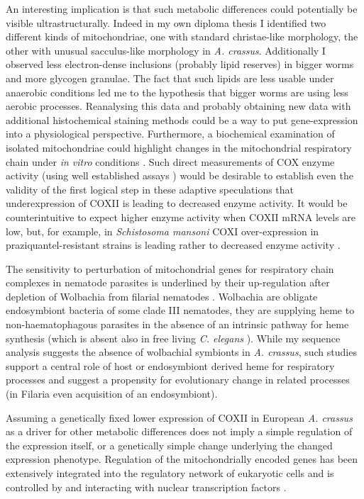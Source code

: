 An interesting implication is that such metabolic differences could
potentially be visible ultrastructurally. Indeed in my own diploma
thesis \cite{heitlinger_vergleichende_2008} I identified two different
kinds of mitochondriae, one with standard christae-like morphology,
the other with unusual sacculus-like morphology in
\textit{A. crassus}. Additionally I observed less electron-dense
inclusions (probably lipid reserves) in bigger worms and more glycogen
granulae. The fact that such lipids are less usable under anaerobic
conditions led me to the hypothesis that bigger worms are using less
aerobic processes. Reanalysing this data and probably obtaining new
data with additional histochemical staining methods could be a way to
put gene-expression into a physiological perspective. Furthermore, a
biochemical examination of isolated mitochondriae could highlight
changes in the mitochondrial respiratory chain under \textit{in vitro}
conditions \cite{pmid18314717}. Such direct measurements of COX enzyme
activity (using well established assays \cite{pmid8592440}) would be
desirable to establish even the validity of the first logical step in
these adaptive speculations that underexpression of COXII is leading
to decreased enzyme activity. It would be counterintuitive to expect
higher enzyme activity when COXII mRNA levels are low, but, for
example, in \textit{Schistosoma mansoni} COXI over-expression in
praziquantel-resistant strains is leading rather to decreased enzyme
activity \cite{pmid9695101}.

The sensitivity to perturbation of mitochondrial genes for respiratory
chain complexes in nematode parasites is underlined by their
up-regulation after depletion of Wolbachia from filarial nematodes
\cite{pmid20362581, pmid19806204}. Wolbachia are obligate endosymbiont
bacteria of some clade III nematodes, they are supplying heme to
non-haematophagous parasites in the absence of an intrinsic pathway
for heme synthesis \cite{ghedin_draft_2007} (which is absent also in
free living \textit{C. elegans} \cite{pmid15767563}). While my
sequence analysis suggests the absence of wolbachial symbionts in
\textit{A. crassus}, such studies support a central role of host or
endosymbiont derived heme for respiratory processes and suggest a
propensity for evolutionary change in related processes (in Filaria
even acquisition of an endosymbiont).

Assuming a genetically fixed lower expression of COXII in European
\textit{A. crassus} as a driver for other metabolic differences does
not imply a simple regulation of the expression itself, or a
genetically simple change underlying the changed expression
phenotype. Regulation of the mitochondrially encoded genes has been
extensively integrated into the regulatory network of eukaryotic
cells and is controlled by and interacting with nuclear transcription
factors \cite{pmid8289797}.

